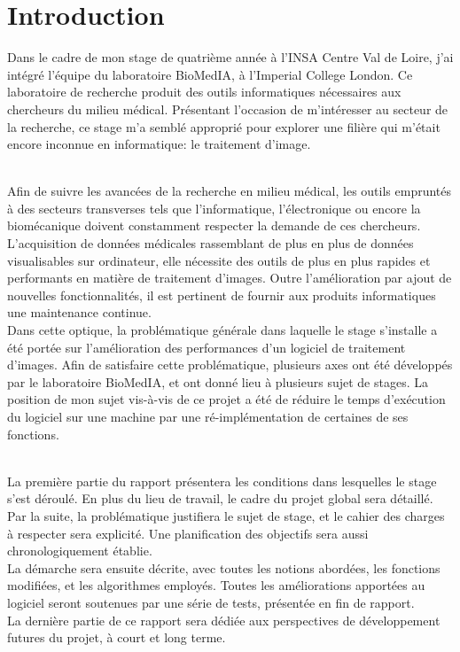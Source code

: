 \documentclass[10pt]{report}
\begin{document}
\chapter*{Introduction}
Dans le cadre de mon stage de quatrième année à l'INSA Centre Val de Loire, j'ai intégré l'équipe du laboratoire BioMedIA, à l'Imperial College London. Ce laboratoire de recherche produit des outils informatiques nécessaires aux chercheurs du milieu médical. Présentant l'occasion de m'intéresser au secteur de la recherche, ce stage m'a semblé approprié pour explorer une filière qui m'était encore inconnue en informatique: le traitement d'image.\\ ~\par  \noindent
Afin de suivre les avancées de la recherche en milieu médical, les outils empruntés à des secteurs transverses tels que l'informatique, l'électronique ou encore la biomécanique doivent constamment respecter la demande de ces chercheurs. L'acquisition de données médicales rassemblant de plus en plus de données visualisables sur ordinateur, elle nécessite des outils de plus en plus rapides et performants en matière de traitement d'images. Outre l'amélioration par ajout de nouvelles fonctionnalités, il est pertinent de fournir aux produits informatiques une maintenance continue. 
\\Dans cette optique, la problématique générale dans laquelle le stage s'installe a été portée sur l'amélioration des performances d'un logiciel de traitement d'images. Afin de satisfaire cette problématique, plusieurs axes ont été développés par le laboratoire BioMedIA, et ont donné lieu à plusieurs sujet de stages. La position de mon sujet vis-à-vis de ce projet a été de réduire le temps d'exécution du logiciel sur une machine par une ré-implémentation de certaines de ses fonctions.  \\ ~\par
\noindent
La première partie du rapport présentera les conditions dans lesquelles le stage s'est déroulé. En plus du lieu de travail, le cadre du projet global sera détaillé.\\
Par la suite, la problématique justifiera le sujet de stage, et le cahier des charges à respecter sera explicité. Une planification des objectifs sera aussi chronologiquement établie.\\
La démarche sera ensuite décrite, avec toutes les notions abordées, les fonctions modifiées, et les algorithmes employés. Toutes les améliorations apportées au logiciel seront soutenues par une série de tests, présentée en fin de rapport.\\
La dernière partie de ce rapport sera dédiée aux perspectives de développement futures du projet, à court et long terme.
\end{document}
